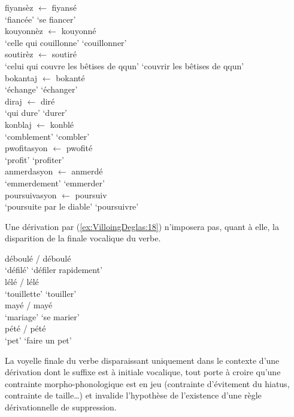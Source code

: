 \documentclass[output=paper]{langsci/langscibook}
\begin{document}
\ea\label{ex:VilloingDeglas:15}
  \ea \gll fiyansèz $\leftarrow$ fiyansé \\
  {`fiancée'} {} {`se fiancer'}\\
  \ex \gll kouyonnèz $\leftarrow$ kouyonné \\
  {`celle qui couillonne'} {} {`couillonner'}\\
  \ex \gll soutirèz $\leftarrow$ soutiré \\
  {`celui qui couvre les bêtises de qqun'} {} {`couvrir les bêtises de qqun'}\\
  \z
\ex\label{ex:VilloingDeglas:16}
  \ea \gll bokantaj $\leftarrow$ bokanté \\
  {`échange'} {} {`échanger'}\\
  \ex \gll diraj $\leftarrow$ diré \\
  {`qui dure'} {} {`durer'}\\
  \ex \gll konblaj $\leftarrow$ konblé \\
  {`comblement'} {} {`combler'}\\
  \z
\ex\label{ex:VilloingDeglas:17}
  \ea \gll pwofitasyon $\leftarrow$ pwofité \\
  {`profit'} {} {`profiter'}\\
  \ex \gll anmerdasyon $\leftarrow$ anmerdé \\
  {`emmerdement'} {} {`emmerder'}\\
  \ex \gll poursuivasyon $\leftarrow$ poursuiv \\
  {`poursuite par le diable'} {} {`poursuivre'}\\
  \z
\z

Une dérivation par  (\ref{ex:VilloingDeglas:18}) n'imposera pas, quant à elle, la
disparition de la finale vocalique du verbe.

\ea\label{ex:VilloingDeglas:18}
  \ea \gll déboulé / déboulé \\
  {`défilé'} {} {`défiler rapidement'}\\
  \ex \gll lélé / lélé \\
  {`touillette'} {} {`touiller'}\\
  \ex \gll mayé / mayé \\
  {`mariage'} {} {`se marier'}\\
  \ex \gll pété / pété \\
  {`pet'} {} {`faire un pet'}\\
  \z
\z


La voyelle finale du verbe disparaissant uniquement dans le contexte
d'une dérivation dont le suffixe est à initiale vocalique, tout porte à
croire qu'une contrainte morpho-phonologique est en jeu (contrainte
d'évitement du hiatus, contrainte de taille\ldots{}) et invalide
l'hypothèse de l'existence d'une règle dérivationnelle de suppression.
\end{document}
